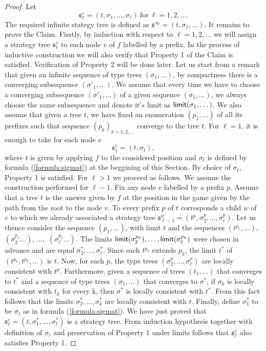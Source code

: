 \begin{proof}
Let \[ \mathfrak{s}^\varepsilon_\ell = (t, \sigma_1, \dots, \sigma_\ell)\ \mbox{for}\ \ell=1,2,\dots.\] The required   
infinite stategy tree is defined as 
$ \mathfrak{s}^\infty = (t, \sigma_1, \dots )$.%
It remains to prove the Claim.
Firstly, by induction with respect to $\ell=1,2,\dots$ we will assign a strategy tree $\mathfrak{s}^v_\ell$ to each node $v$ of $f$ labelled by a prefix. %
In the process of inductive construction we will also verify that Property 1 of the Claim is satisfied. Verification of Property 2 will be done later. Let us start from a remark that given an infinite sequence of type trees $(\sigma_1, \dots)$, by compactness there is a converging subsequence $(\sigma'_1, \dots)$. We assume that every time we have to choose  
a converging subsequence $(\sigma'_1, \dots)$ of a given sequence $(\sigma_1, \dots)$, we always choose the same subsequence and denote it's limit as 
$\mathsf{limit}(\sigma_1, \dots)$. We also assume that given a tree $t$, we have fixed an enumeration $(p_1, \dots)$ of all its prefixes such 
that sequence $(p_k)_{k=1,2,\dots}$ converge to the tree $t$.
For $\ell=1$, 
it is enough to take for each node $v$  \[ \mathfrak{s}^v_1=(t, \sigma_t),\] where $t$ is given by applying $f$ to the considered position and $\sigma_t$ is defined by formula (\ref{formula:sigmat}) at the beggining of this Section. By choice of $\sigma_t$, Property 1 is satisfied. For $\ell>1$ we proceed as follows. We assume the construction performed for $\ell-1$. Fix any node $v$ labelled by a prefix $p$. Assume that a tree $t$ is the answer given by $f$  at the position in the game given by the path from the root to the node $v$. To every prefix $p$ of $t$ corresponds a child $w$ of $v$ to which we already associated a strategy tree $\mathfrak{s}^w_{\ell-1}=(t^p, \sigma^p_{2}, \dots, \sigma^p_{\ell})$. 
Let us thence consider the sequence $(p_1, \dots)$, with limit $t$ and the sequences
$(t^{p_1}, \dots)$, $(\sigma^{p_1}_2\dots)$, $\dots,$  $(\sigma^{p_1}_{\ell}\dots)$.  The limits $\mathsf{limit}(\sigma^{p_k}_2),\dots,
\mathsf{limit}(\sigma^{p_k}_{\ell})$ were chosen in advance and are equal $\sigma^*_2, \dots, \sigma^*_\ell$. Since each $t^{p_k}$ extends $p_k$, the limit $t^*$ of  $(t^{p_1},t^{p_2},\dots)$ is $t$.
Now, for each $p$, the type trees $(\sigma^p_{2}, \dots, \sigma^p_{\ell})$
are locally consistent with $t^p$. Furthermore, given a sequence of trees $(t_1, \dots)$  that converges to $t^*$ and a sequence of type trees $(\sigma_1, \dots)$  that converges to $\sigma^*$, if $\sigma_k$ is locally consistent with $t_k$ for every k, then $\sigma^*$ is locally consistent with $t^*$.
From this fact follows that the limits $\sigma^*_2, \dots, \sigma^*_k$ are locally consistent with $t$. Finally, define $\sigma^*_1$ to be $\sigma_t$ as in formula (\ref{formula:sigmat}). We have just proved that
$\mathfrak{s}^v_\ell = (t, \sigma^*_1, \dots, \sigma^*_\ell)$
is a strategy tree. From induction hypothesis together with definition of $\sigma_t$ and preservation of Property 1 under limits follows that $\mathfrak{s}^v_\ell$ also 
satisfies Property 1. 


\end{proof}
